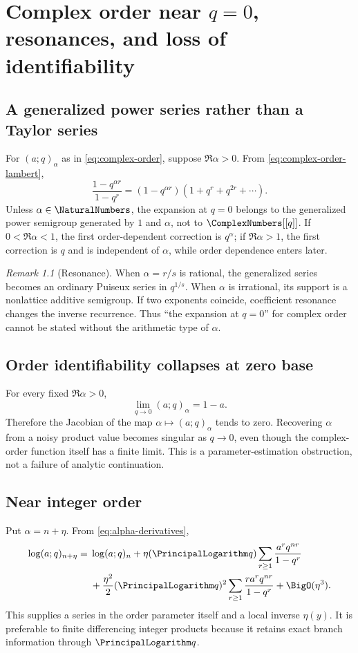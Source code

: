 \documentclass[11pt,letterpaper,oneside,openany]{book}
\theoremstyle{definition}
\theoremstyle{remark}
\newtheorem{remark}{Remark}[chapter]
\begin{document}
\chapter{Complex order near \(q=0\), resonances, and loss of identifiability}

\section{A generalized power series rather than a Taylor series}
For \((a;q)_\alpha\) as in \cref{eq:complex-order}, suppose
\(\Re\alpha>0\).  From \cref{eq:complex-order-lambert},
\[
 \frac{1-q^{\alpha r}}{1-q^r}
 =(1-q^{\alpha r})(1+q^r+q^{2r}+\cdots).
\]
Unless \(\alpha\in\NaturalNumbers\), the expansion at \(q=0\) belongs to the generalized
power semigroup generated by \(1\) and \(\alpha\), not to \(\ComplexNumbers[[q]]\).  If
\(0<\Re\alpha<1\), the first order-dependent correction is \(q^\alpha\); if
\(\Re\alpha>1\), the first correction is \(q\) and is independent of
\(\alpha\), while order dependence enters later.

\begin{remark}[Resonance]
When \(\alpha=r/s\) is rational, the generalized series becomes an ordinary
Puiseux series in \(q^{1/s}\).  When \(\alpha\) is irrational, its support is a
nonlattice additive semigroup.  If two exponents coincide, coefficient
resonance changes the inverse recurrence.  Thus ``the expansion at \(q=0\)''
for complex order cannot be stated without the arithmetic type of
\(\alpha\).
\end{remark}

\section{Order identifiability collapses at zero base}
For every fixed \(\Re\alpha>0\),
\[
 \lim_{q\to0}(a;q)_\alpha=1-a.
\]
Therefore the Jacobian of the map \(\alpha\mapsto(a;q)_\alpha\) tends to zero.
Recovering \(\alpha\) from a noisy product value becomes singular as
\(q\to0\), even though the complex-order function itself has a finite limit.
This is a parameter-estimation obstruction, not a failure of analytic
continuation.

\section{Near integer order}
Put \(\alpha=n+\eta\).  From \cref{eq:alpha-derivatives},
\begin{align}
 \log(a;q)_{n+\eta}
 ={}&\log(a;q)_n
 +\eta(\PrincipalLogarithm q)\sum_{r\ge1}
 \frac{a^rq^{nr}}{1-q^r} \notag \\
 &+\frac{\eta^2}{2}(\PrincipalLogarithm q)^2\sum_{r\ge1}
 \frac{ra^rq^{nr}}{1-q^r}+\BigO(\eta^3).
 \label{eq:order-near-integer}
\end{align}
This supplies a series in the order parameter itself and a local inverse
\(\eta(y)\).  It is preferable to finite differencing integer products because
it retains exact branch information through \(\PrincipalLogarithm q\).
\end{document}
